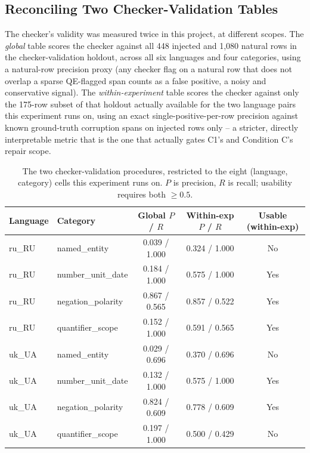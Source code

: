 \documentclass[11pt,letterpaper]{article}
\begin{document}
\subsection{Reconciling Two Checker-Validation Tables}

The checker's validity was measured twice in this project, at different scopes. The \emph{global} table scores the checker against all 448 injected and 1,080 natural rows in the checker-validation holdout, across all six languages and four categories, using a natural-row precision proxy (any checker flag on a natural row that does not overlap a sparse QE-flagged span counts as a false positive, a noisy and conservative signal). The \emph{within-experiment} table scores the checker against only the 175-row subset of that holdout actually available for the two language pairs this experiment runs on, using an exact single-positive-per-row precision against known ground-truth corruption spans on injected rows only -- a stricter, directly interpretable metric that is the one that actually gates C1's and Condition C's repair scope.

\begin{table}[!htbp]
\centering
\small
\begin{tabular}{llccc}
\toprule
Language & Category & Global $P$ / $R$ & Within-exp $P$ / $R$ & Usable (within-exp) \\
\midrule
ru\_RU & named\_entity & 0.039 / 1.000 & 0.324 / 1.000 & No \\
ru\_RU & number\_unit\_date & 0.184 / 1.000 & 0.575 / 1.000 & Yes \\
ru\_RU & negation\_polarity & 0.867 / 0.565 & 0.857 / 0.522 & Yes \\
ru\_RU & quantifier\_scope & 0.152 / 1.000 & 0.591 / 0.565 & Yes \\
uk\_UA & named\_entity & 0.029 / 0.696 & 0.370 / 0.696 & No \\
uk\_UA & number\_unit\_date & 0.132 / 1.000 & 0.575 / 1.000 & Yes \\
uk\_UA & negation\_polarity & 0.824 / 0.609 & 0.778 / 0.609 & Yes \\
uk\_UA & quantifier\_scope & 0.197 / 1.000 & 0.500 / 0.429 & No \\
\bottomrule
\end{tabular}
\caption{The two checker-validation procedures, restricted to the eight (language, category) cells this experiment runs on. $P$ is precision, $R$ is recall; usability requires both $\geq 0.5$.}
\label{tab:checkervalidation}
\end{table}
\end{document}
